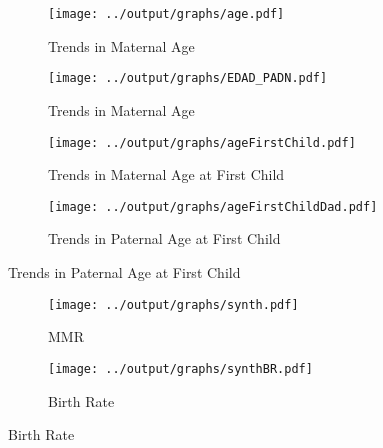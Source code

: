 \documentclass[a4paper, 11pt]{article}
\begin{document}
\begin{appendices}
  
  \begin{figure}[htpb!]
  	\centering	\caption{Trends in Reform and non-Reform Areas}
  	\label{trendsAge}
  	\begin{subfigure}{.5\textwidth}
  		\centering 
  		\texttt{[image: ../output/graphs/age.pdf]}\caption{Trends in Maternal Age}
  		\label{age}
  	\end{subfigure}%
  	\begin{subfigure}{.5\textwidth}
  		\centering 	
  		\texttt{[image: ../output/graphs/EDAD\_PADN.pdf]}
  		\caption{Trends in Maternal Age}
  		\label{agedad}
  	\end{subfigure}
  	\begin{subfigure}{.5\textwidth}
  		\centering 
  		\texttt{[image: ../output/graphs/ageFirstChild.pdf]}
  		\caption{Trends in Maternal Age at First Child}
  		\label{firstchild_mom}
  	\end{subfigure}%
  	\begin{subfigure}{.5\textwidth}
  		\centering
  		\texttt{[image: ../output/graphs/ageFirstChildDad.pdf]}
  		\caption{Trends in Paternal Age at First Child}
  		\label{firstchild_dad}
  	\end{subfigure}
  	
  \end{figure}
  
   
   \begin{figure}[H] \caption{Synthetic Control Group} \centering
   	
   	\begin{subfigure}{.5\textwidth}
   		\centering 
   		\texttt{[image: ../output/graphs/synth.pdf]}
   		\caption{MMR}
   	
   	\end{subfigure}%
   	\begin{subfigure}{.5\textwidth}
   		\centering
   		\texttt{[image: ../output/graphs/synthBR.pdf]}
   		\caption{Birth Rate}
   		
   	\end{subfigure}
   	
    
   \end{figure} 
   

\end{appendices}
\end{document}
